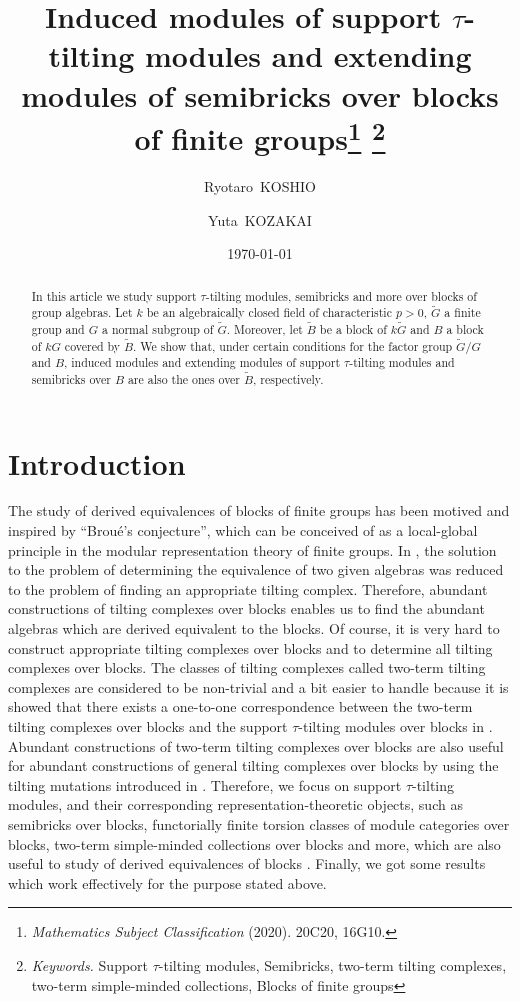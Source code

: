\documentclass[pdftex,a4paper]{article}
\title{Induced modules of support \(\tau\)-tilting modules and extending modules of semibricks over blocks of finite groups\footnote{\emph{Mathematics Subject Classification} (2020). 20C20, 16G10.
}
\footnote{\emph{Keywords.} Support \(\tau\)-tilting modules, Semibricks, two-term tilting complexes, two-term simple-minded collections, Blocks of finite groups}}
\author{Ryotaro~KOSHIO \and Yuta~KOZAKAI}
\date{\today}
\numberwithin{equation}{subsection}
\theoremstyle{definition}
\begin{document}
\maketitle
\begin{abstract}
	In this article we study support \(\tau\)-tilting modules, semibricks and more over blocks of  group algebras.
	Let \(k\) be an algebraically closed field  of characteristic \(p>0\), \(\tilde{G}\) a finite group and \(G\) a normal subgroup of \(\tilde{G}\).
	Moreover, let \(\tilde{B}\) be a block of \(k\tilde{G}\) and \(B\) a block of \(kG\) covered by \(\tilde{B}\).
	We show that, under certain conditions for the factor group \(\tilde{G}/G\) and \(B\), induced modules and extending modules of support \(\tau\)-tilting modules and semibricks over \(B\) are also the ones over \(\tilde{B}\), respectively.
\end{abstract}

\tableofcontents

\section{Introduction}\label{intro 2021-11-04 11:17:58}
The study of derived equivalences of blocks of finite groups has been motived and inspired by ``Brou\'{e}'s conjecture'', which can be conceived of as a local-global principle in the modular representation theory of finite groups.
In \cite{MR1002456}, the solution to the problem of determining the equivalence of two given algebras was reduced to the problem of finding an appropriate tilting complex.
Therefore, abundant constructions of tilting complexes over blocks enables us to find the abundant algebras which are derived equivalent to the blocks.
Of course, it is very hard to construct appropriate tilting complexes over blocks and to determine all tilting complexes over blocks.
The classes of tilting complexes called two-term tilting complexes are considered to be non-trivial and a bit easier to handle
because it is showed that there exists a one-to-one correspondence between the two-term tilting complexes over blocks and the support \(\tau\)-tilting modules over blocks in \cite{MR3187626}.
Abundant constructions of two-term tilting complexes over blocks are also useful for abundant constructions of general tilting complexes over blocks by using the tilting mutations introduced in \cite{MR2927802}.
Therefore, we focus on support \(\tau\)-tilting modules, and their corresponding representation-theoretic objects, such as semibricks over blocks, functorially finite torsion classes of module categories over blocks, two-term simple-minded collections over blocks and more, which are also useful to study of derived equivalences of blocks \cite{MR4139031,MR3910476}.
Finally, we got some results which work effectively for the purpose stated above.
\end{document}
